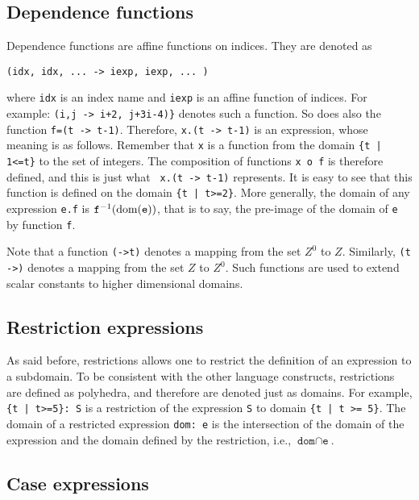 \subsection{Dependence functions}

Dependence functions are affine functions on indices.
They are denoted as
\begin{center}
\texttt{(idx, idx, ... -> iexp, iexp, ... )}
\end{center}
where \texttt{idx} is an index name and \texttt{iexp} is an affine
function of indices.  For example: {\tt (i,j -> i+2, j+3i-4)\}}
denotes such a function.  So does also the function {\tt f=(t ->
t-1)}. Therefore, {\tt x.(t -> t-1)} is an {\alfa} expression, whose
meaning is as follows.  Remember that {\tt x} is a function from the
domain {\tt \{t | 1<=t\}} to the set of integers. The composition of
functions {\tt x o f} is therefore defined, and this is just what {\tt
x.(t -> t-1)} represents. It is easy to see that this function is
defined on the domain {\tt \{t | t>=2\}}.  More generally, the domain
of any expression {\tt e.f} is ${\tt f}^{-1}(\mbox{dom}({\tt e}))$,
that is to say, the pre-image of the domain of {\tt e} by function
{\tt f}.

Note that a function {\tt (->t)} denotes a mapping from the set $Z^0$
to $Z$. Similarly, {\tt (t ->)} denotes a mapping from the set $Z$ to
$Z^0$. Such functions are used to extend scalar constants to higher
dimensional domains.

\subsection{Restriction expressions}

 As said before, restrictions allows one to
restrict the definition of an expression to a subdomain. To be
consistent with the other language constructs, restrictions are
defined as polyhedra, and therefore are denoted just as domains. For
example, {\tt \{t | t>=5\}: S} is a restriction of the expression
\texttt{S} to domain \texttt{\{t | t >= 5\}}. The domain of a
restricted expression \texttt{dom: e} is the intersection of the
domain of the expression and the domain defined by the restriction,
i.e., $\texttt{dom} \cap \texttt{e}$.

\subsection{Case expressions}

